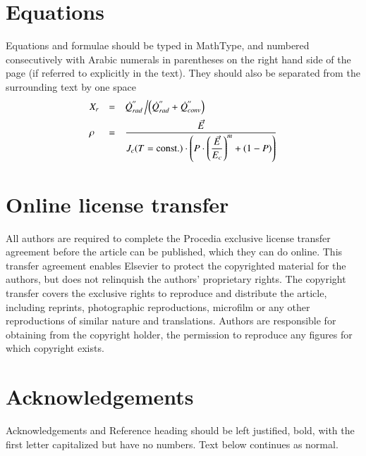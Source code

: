 \documentclass[3p,times,procedia]{elsarticle}
\begin{document}
\section{Equations}
Equations and formulae should be typed in MathType, and numbered consecutively with Arabic numerals in parentheses on the right hand side of the page (if referred to explicitly in the text). They should also be separated from the surrounding text by one space
\begin{equation}
\begin{array}{lcl}
\displaystyle X_r &=& \displaystyle\dot{Q}^{''}_{rad}\left/\left(\dot{Q}^{''}_{rad} + \dot{Q}^{''}_{conv}\right)\right.\\[6pt]
\displaystyle \rho &=& \displaystyle\frac{\vec{E}}{J_c(T={\rm const.})\cdot\left(P\cdot\left(\displaystyle\frac{\vec{E}}{E_c}\right)^m+(1-P)\right)}
\end{array}
\end{equation}


\section{Online license transfer}
All authors are required to complete the Procedia exclusive license transfer agreement before the article can be published, which they can do online. This transfer agreement enables Elsevier to protect the copyrighted material for the authors, but does not relinquish the authors' proprietary rights. The copyright transfer covers the exclusive rights to reproduce and distribute the article, including reprints, photographic reproductions, microfilm or any other reproductions of similar nature and translations. Authors are responsible for obtaining from the copyright holder, the permission to reproduce any figures for which copyright exists.

\section*{Acknowledgements}

Acknowledgements and Reference heading should be left justified, bold, with the first letter capitalized but have no numbers. Text below continues as normal.


\end{document}
